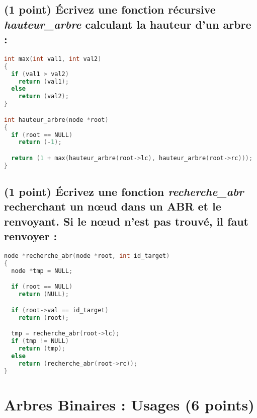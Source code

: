 \documentclass[11pt,a4paper]{article}
\begin{document}
\clearpage


\subsection{(1 point) \'Ecrivez une fonction récursive \og \textit{hauteur\_arbre} \fg{} calculant la hauteur d'un arbre : }

\begin{lstlisting}[language=C]
int max(int val1, int val2)
{
  if (val1 > val2)
    return (val1);
  else
    return (val2);
}

int hauteur_arbre(node *root)
{
  if (root == NULL)
    return (-1);

  return (1 + max(hauteur_arbre(root->lc), hauteur_arbre(root->rc)));
}
\end{lstlisting}

\medskip

\subsection{(1 point) \'Ecrivez une fonction \og \textit{recherche\_abr} \fg{} recherchant un nœud dans un ABR et le renvoyant. Si le nœud n'est pas trouvé, il faut renvoyer  : }

\begin{lstlisting}[language=C]
node *recherche_abr(node *root, int id_target)
{
  node *tmp = NULL;

  if (root == NULL)
    return (NULL);

  if (root->val == id_target)
    return (root);

  tmp = recherche_abr(root->lc);
  if (tmp != NULL)
    return (tmp);
  else
    return (recherche_abr(root->rc));
}
\end{lstlisting}

\clearpage






\section{Arbres Binaires : Usages (6 points)}
\end{document}
